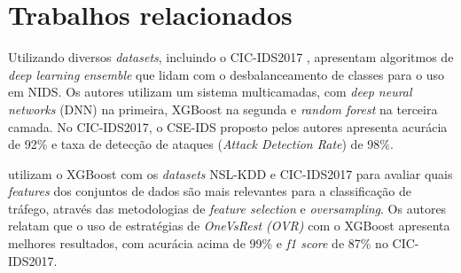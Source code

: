 \documentclass[12pt]{article}
\begin{document}



\section{Trabalhos relacionados}
\label{cap:trabalhos}

Utilizando diversos \textit{datasets}, incluindo o CIC-IDS2017 \cite{sharafaldin2018toward}, \cite{gupta2022cse} apresentam algoritmos de \textit{deep learning} \textit{ensemble} que lidam com o desbalanceamento de classes para o uso em NIDS. Os autores utilizam um sistema multicamadas, com \textit{deep neural networks} (DNN) na primeira, XGBoost na segunda e \textit{random forest} na terceira camada. No CIC-IDS2017, o CSE-IDS proposto pelos autores apresenta acurácia de 92\% e taxa de detecção de ataques (\textit{Attack Detection Rate}) de 98\%.

\cite{al2022dealing} utilizam o XGBoost com os \textit{datasets} NSL-KDD \cite{tavallaee2009detailed} e CIC-IDS2017 para avaliar quais \emph{features} dos conjuntos de dados são mais relevantes para a classificação de tráfego, através das metodologias de \emph{feature selection} e \emph{oversampling}. Os autores relatam que o uso de estratégias de \emph{OneVsRest (OVR)} com o XGBoost apresenta melhores resultados, com acurácia acima de 99\% e \emph{f1 score} de 87\% no CIC-IDS2017.
\end{document}

